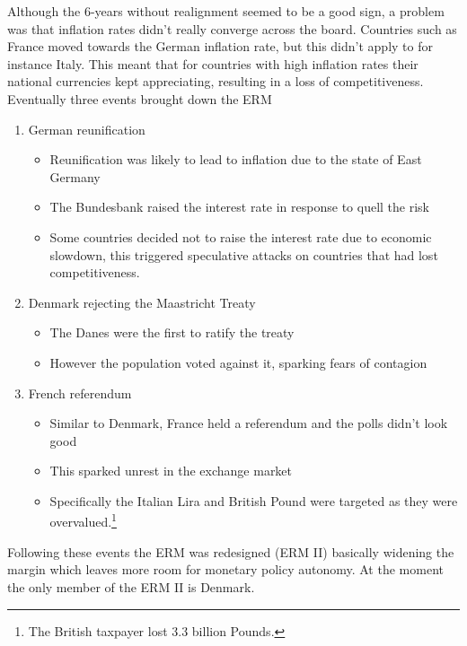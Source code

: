 \documentclass{tufte-handout}
\begin{document}
Although the 6-years without realignment seemed to be a good sign, a problem was that inflation rates didn't really converge across the board. 
Countries such as France moved towards the German inflation rate, but this didn't apply to for instance Italy. 
This meant that for countries with high inflation rates their national currencies kept appreciating, resulting in a loss of competitiveness. 
Eventually three events brought down the ERM
\begin{enumerate}
  \item German reunification
  \begin{itemize}
    \item Reunification was likely to lead to inflation due to the state of East Germany
    \item The Bundesbank raised the interest rate in response to quell the risk
    \item Some countries decided not to raise the interest rate due to economic slowdown, this triggered speculative attacks on countries that had lost competitiveness. 
  \end{itemize}
  \item Denmark rejecting the Maastricht Treaty
  \begin{itemize}
    \item The Danes were the first to ratify the treaty
    \item However the population voted against it, sparking fears of contagion
  \end{itemize}
  \item French referendum
  \begin{itemize}
    \item Similar to Denmark, France held a referendum and the polls didn't look good
    \item This sparked unrest in the exchange market
    \item Specifically the Italian Lira and British Pound were targeted as they were overvalued.\footnote{The British taxpayer lost 3.3 billion Pounds.}
  \end{itemize}
\end{enumerate}

Following these events the ERM was redesigned (ERM II) basically widening the margin which leaves more room for monetary policy autonomy. 
At the moment the only member of the ERM II is Denmark.

\end{document}
